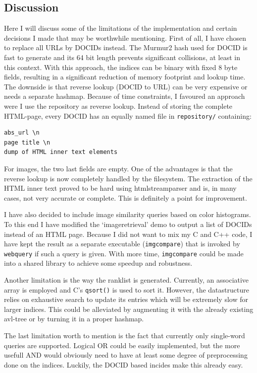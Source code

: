 \documentclass[10pt,a4paper]{article}
\begin{document}
\subsection{Discussion}

Here I will discuss some of the limitations of the implementation and certain decisions I made that may be worthwhile mentioning. First of all, I have chosen to replace all URLs by DOCIDs instead. The Murmur2 hash used for DOCID is fast to generate and its 64 bit length prevents significant collisions, at least in this context. With this approach, the indices can be binary with fixed 8 byte fields, resulting in a significant reduction of memory footprint and lookup time. The downside is that reverse lookup (DOCID to URL) can be very expensive or needs a separate hashmap. Because of time constraints, I favoured an approach were I use the repository as reverse lookup. Instead of storing the complete HTML-page, every DOCID has an equally named file in \texttt{repository/} containing:
\begin{verbatim}
abs_url \n
page title \n
dump of HTML inner text elements
\end{verbatim}
For images, the two last fields are empty. One of the advantages is that the reverse lookup is now completely handled by the filesystem. The extraction of the HTML inner text proved to be hard using htmlstreamparser and is, in many cases, not very accurate or complete. This is definitely a point for improvement.\par
I have also decided to include image similarity queries based on color histograms. To this end I have modified the `imageretrieval' demo to output a list of DOCIDs instead of an HTML page. Because I did not want to mix my C and C++ code, I have kept the result as a separate executable (\texttt{imgcompare}) that is invoked by \texttt{webquery} if such a query is given. With more time, \texttt{imgcompare} could be made into a shared library to achieve some speedup and robustness.\par
Another limitation is the way the ranklist is generated. Currently, an associative array is employed and C's \texttt{qsort()} is used to sort it. However, the datastructure relies on exhaustive search to update its entries which will be extremely slow for larger indices. This could be alleviated by augmenting it with the already existing avl-tree or by turning it in a proper hashmap.\par
The last limitation worth to mention is the fact that currently only single-word queries are supported. Logical OR could be easily implemented, but the more usefull AND would obviously need to have at least some degree of preprocessing done on the indices. Luckily, the DOCID based incides make this already easy.
\end{document}

